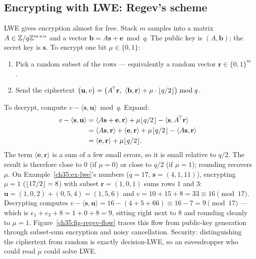 \subsection{Encrypting with LWE: Regev's scheme}
\label{ch35:regev}

LWE gives encryption almost for free. Stack $m$ samples into a matrix $A\in \mathbb{Z}/q\mathbb{Z}^{m\times n}$ and a vector $\mathbf b = A\mathbf s + \mathbf e \bmod q$. The public key is $(A,\mathbf b)$; the secret key is $\mathbf s$. To encrypt one bit $\mu\in\{0,1\}$:

\begin{enumerate}
  \item Pick a random subset of the rows --- equivalently a random vector $\mathbf r\in\{0,1\}^m$.
  \item Send the ciphertext $\big(\mathbf u, v\big) = \big(A^{\!\top}\mathbf r,\ \langle \mathbf b,\mathbf r\rangle + \mu\cdot\lfloor q/2\rfloor\big) \bmod q$.
\end{enumerate}
To decrypt, compute $v - \langle \mathbf s, \mathbf u\rangle \bmod q$. Expand:
\begin{align*}
  v - \langle\mathbf s,\mathbf u\rangle &= \langle A\mathbf s+\mathbf e,\mathbf r\rangle + \mu\lfloor q/2\rfloor - \langle \mathbf s, A^{\!\top}\mathbf r\rangle \\
  &= \langle A\mathbf s,\mathbf r\rangle + \langle\mathbf e,\mathbf r\rangle + \mu\lfloor q/2\rfloor - \langle A\mathbf s, \mathbf r\rangle \\
  &= \langle\mathbf e,\mathbf r\rangle + \mu\lfloor q/2\rfloor.
\end{align*}
The term $\langle\mathbf e,\mathbf r\rangle$ is a sum of a few small errors, so it is small relative to $q/2$. The result is therefore close to $0$ (if $\mu=0$) or close to $q/2$ (if $\mu=1$); rounding recovers $\mu$. On Example~\ref{ch35:ex-lwe}'s numbers ($q = 17$, $\mathbf{s} = (4,1,11)$), encrypting $\mu = 1$ ($\lfloor17/2\rfloor = 8$) with subset $\mathbf{r} = (1, 0, 1)$ sums rows $1$ and $3$: $\mathbf{u} = (1,0,2) + (0,5,4) = (1,5,6)$ and $v = 10 + 15 + 8 = 33 \equiv 16 \pmod{17}$. Decrypting computes $v - \langle\mathbf{s}, \mathbf{u}\rangle = 16 - (4 + 5 + 66) \equiv 16 - 7 = 9 \pmod{17}$ --- which is $e_1 + e_3 + 8 = 1 + 0 + 8 = 9$, sitting right next to $8$ and rounding cleanly to $\mu = 1$. Figure~\ref{ch35:fig-regev-flow} traces this flow from public-key generation through subset-sum encryption and noisy cancellation. Security: distinguishing the ciphertext from random is exactly decision-LWE, so an eavesdropper who could read $\mu$ could solve LWE.

